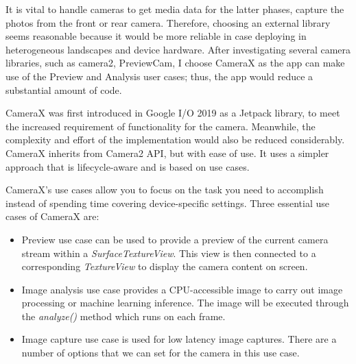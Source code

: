 It is vital to handle cameras to get media data for the latter phases, capture the photos from the front or rear camera. Therefore, choosing an external library seems reasonable because it would be more reliable in case deploying in heterogeneous landscapes and device hardware. After investigating several camera libraries, such as camera2, PreviewCam, I choose CameraX as the app can make use of the Preview and Analysis user cases; thus, the app would reduce a substantial amount of code.\par

CameraX was first introduced in Google I/O 2019 as a Jetpack library, to meet the increased requirement of functionality for the camera. Meanwhile, the complexity and effort of the implementation would also be reduced considerably. CameraX inherits from Camera2 API, but with ease of use. It uses a simpler approach that is lifecycle-aware and is based on use cases. \par

CameraX's use cases allow you to focus on the task you need to accomplish instead of spending time covering device-specific settings. Three essential use cases of CameraX are: \par
\begin{itemize}
\item	Preview use case can be used to provide a preview of the current camera stream within a \emph{SurfaceTextureView}. This view is then connected to a corresponding \emph{TextureView} to display the camera content on screen. 
\item  Image analysis use case provides a CPU-accessible image to carry out image processing or machine learning inference. The image will be executed through the \emph{analyze()} method which runs on each frame.
\item	Image capture use case is used for low latency image captures. There are a number of options that we can set for the camera in this use case.
\end{itemize}


